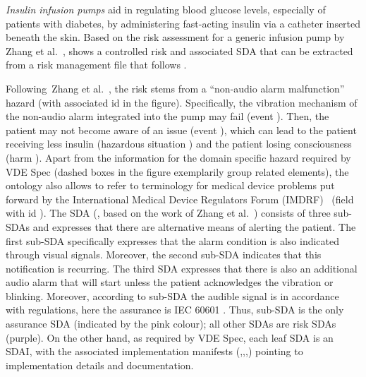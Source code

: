 \emph{Insulin infusion pumps}
aid in regulating blood glucose levels, especially of patients with diabetes, by administering fast-acting insulin via a catheter inserted beneath the skin. Based on the risk assessment for a generic infusion pump by Zhang et al.~\cite{zhangJJ10,zhangJJR11},  shows %
a controlled risk and associated SDA that can be extracted from a risk management file that follows \vdespec.%

Following~Zhang et al.~\cite[entry 4.3.9 in Table 4 in the appendix]{zhangJJ10}, the risk stems from a ``non-audio alarm malfunction'' hazard (with associated id  in the figure).
Specifically, the vibration mechanism of the non-audio alarm integrated into the pump may fail (event ).
Then, the patient may not become aware of an issue (event ), which can lead to the patient receiving less insulin (hazardous situation ) and the patient losing consciousness (harm ).
Apart from the information for the domain specific hazard  required by VDE Spec (dashed boxes in the figure exemplarily group related elements), the \riskman ontology also allows to refer to terminology for medical device problems put forward by the International Medical Device Regulators Forum (IMDRF)~\cite{IMDRF20AET} (field with id ).
The SDA (, based on the work of Zhang et al.~\cite[Table 3]{zhangJJR11}) consists of three sub-SDAs and expresses that there are alternative means of alerting the patient.
The first sub-SDA  specifically expresses that the alarm condition is also indicated through visual signals.
Moreover, the second sub-SDA  indicates that this notification is recurring.
The third SDA  expresses that there is also an additional audio alarm that will start unless the patient acknowledges the vibration or blinking.
Moreover, according to sub-SDA  the audible signal is in accordance with regulations, here the assurance is IEC 60601 . Thus, sub-SDA  is the only assurance SDA (indicated by the pink colour); all other SDAs are risk SDAs (purple).
On the other hand, as required by VDE Spec, each leaf SDA is an SDAI, with the associated implementation manifests (,,,) pointing to implementation details and documentation.